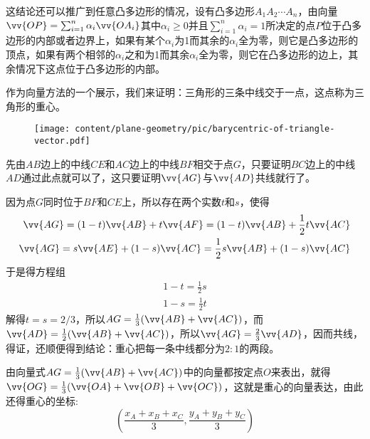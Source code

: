\begin{example}
  这结论还可以推广到任意凸多边形的情况，设有凸多边形$A_1A_2\cdots A_n$，由向量$\vv{OP}=\sum_{i=1}^n\alpha_i\vv{OA_i}$其中$\alpha_i\geqslant 0$并且$\sum_{i=1}^n\alpha_i=1$所决定的点$P$位于凸多边形的内部或者边界上，如果有某个$\alpha_i$为1而其余的$\alpha_i$全为零，则它是凸多边形的顶点，如果有两个相邻的$\alpha_i$之和为1而其余$\alpha_i$全为零，则它在凸多边形的边上，其余情况下这点位于凸多边形的内部。
\end{example}

\begin{example}[三角形的重心]
  \label{example:barycentric-of-triangle-vector}
  作为向量方法的一个展示，我们来证明：三角形的三条中线交于一点，这点称为三角形的重心。
  
\begin{figure}[htbp]
\centering
\texttt{[image: content/plane-geometry/pic/barycentric-of-triangle-vector.pdf]}
\caption{}
\label{fig:barycentric-of-triangle-vector}
\end{figure}

  先由$AB$边上的中线$CE$和$AC$边上的中线$BF$相交于点$G$，只要证明$BC$边上的中线$AD$通过此点就可以了，这只要证明$\vv{AG}$与$\vv{AD}$共线就行了。

  因为点$G$同时位于$BF$和$CE$上，所以存在两个实数$t$和$s$，使得
  \begin{eqnarray*}
    \vv{AG} = (1-t) \vv{AB} + t \vv{AF} = (1-t) \vv{AB} + \frac{1}{2} t \vv{AC} \\
    \vv{AG} = s \vv{AE} + (1-s) \vv{AC} = \frac{1}{2} s \vv{AB} + (1-s) \vv{AC}
  \end{eqnarray*}
  于是得方程组
  \begin{eqnarray*}
    1-t = \frac{1}{2} s \\
    1-s = \frac{1}{2} t
  \end{eqnarray*}
  解得$t=s=2/3$，所以$AG=\frac{1}{3}(\vv{AB}+\vv{AC})$，而$\vv{AD}=\frac{1}{2}(\vv{AB}+\vv{AC})$，所以$\vv{AG}=\frac{2}{3}\vv{AD}$，因而共线，得证，还顺便得到结论：重心把每一条中线都分为$2:1$的两段。

  由向量式$AG=\frac{1}{3}(\vv{AB}+\vv{AC})$中的向量都按定点$O$来表出，就得$\vv{OG}=\frac{1}{3}(\vv{OA}+\vv{OB}+\vv{OC})$，这就是重心的向量表达，由此还得重心的坐标:
  \begin{equation*}
    \left( \frac{x_A+x_B+x_C}{3}, \frac{y_A+y_B+y_C}{3} \right)
  \end{equation*}
\end{example}

